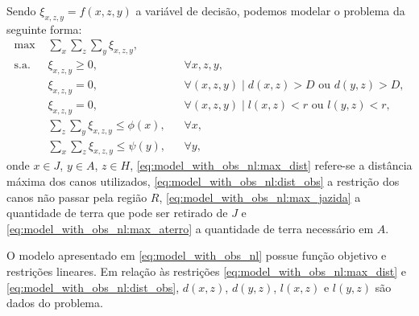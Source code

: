 Sendo $\xi_{x, z, y} = f(x, z, y)$ a variável de decisão, podemos modelar o
problema da seguinte forma:
\begin{subequations}
    \begin{align}
        \text{max } & \sum_{x} \sum_{z} \sum_{y} \xi_{x, z, y},
        \label{eq:model_with_obs_nl:obj_func} \\
        \text{s.a. } & \xi_{x, z, y} \geq 0, && \forall x, z, y,
        \label{eq:model_with_obs_nl:var} \\
        & \xi_{x, z, y} = 0, && \forall (x, z, y) \mid d(x, z) > D \text{ ou } 
        d(y, z) > D,
        \label{eq:model_with_obs_nl:max_dist} \\
        & \xi_{x, z, y} = 0, && \forall (x, z, y) \mid l(x, z) < r \text{ ou }
        l(y, z) < r,
        \label{eq:model_with_obs_nl:dist_obs} \\
        & \sum_{z} \sum_{y} \xi_{x, z, y} \leq \phi(x), && \forall x,
        \label{eq:model_with_obs_nl:max_jazida} \\
        & \sum_{x} \sum_{z} \xi_{x, z, y} \leq \psi(y), && \forall y,
        \label{eq:model_with_obs_nl:max_aterro}
    \end{align}
    \label{eq:model_with_obs_nl}
\end{subequations}
onde $x \in J$, $y \in A$, $z \in H$, \eqref{eq:model_with_obs_nl:max_dist}
refere-se a distância máxima dos canos utilizados,
\eqref{eq:model_with_obs_nl:dist_obs} a restrição dos canos não passar pela
região $R$, \eqref{eq:model_with_obs_nl:max_jazida} a quantidade de terra que pode
ser retirado de $J$ e \eqref{eq:model_with_obs_nl:max_aterro} a quantidade de terra
necessário em $A$.

O modelo apresentado em \eqref{eq:model_with_obs_nl} possue função objetivo e
restrições lineares. Em relação \`{a}s restrições
\eqref{eq:model_with_obs_nl:max_dist} e \eqref{eq:model_with_obs_nl:dist_obs},
$d(x, z)$, $d(y, z)$, $l(x, z)$ e $l(y, z)$ são dados do problema.

